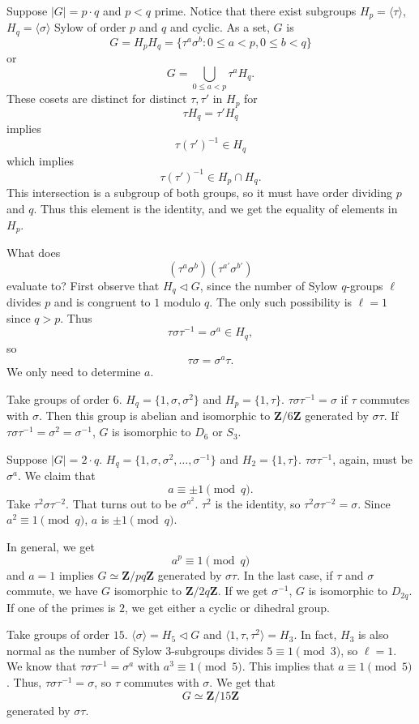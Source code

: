 \documentclass[11pt, oneside]{amsart}
\numberwithin{equation}{section}
\numberwithin{theorem}{section}
\theoremstyle{definition}
\def\Z{\mathbf{Z}}
\begin{document}
{Suppose $|G| = p\cdot q$ and $p< q$ prime. Notice that there exist subgroups $H_p = \langle \tau\rangle$, $H_q= \langle\sigma\rangle$ Sylow of order $p$ and $q$ and cyclic. As a set, $G$ is  
$$
G = H_p H_q = \{ \tau^a\sigma^b : 0\leqslant a< p, 0\leqslant b<q \}
$$
or
$$
G = \bigcup_{0\leqslant a < p} \tau ^ a H_q.
$$
These cosets are distinct for distinct $\tau, \tau'$ in $H_p$ for 
$$
\tau H_q = \tau'H_q
$$
implies
$$
\tau(\tau')^{-1} \in H_q
$$
which implies
$$
\tau(\tau')^{-1}\in H_p\cap H_q. 
$$
This intersection is a subgroup of both groups, so it must have order dividing $p$ and $q$. Thus this element is the identity, and we get the equality of elements in $H_p$. 

What does
$$
(\tau^a\sigma^b)(\tau^{a'}\sigma^{b'})
$$
evaluate to? First observe that $H_q\lhd G$, since the number of Sylow $q$-groups $\ell$ divides $p$ and is congruent to $1$ modulo $q$. The only such possibility is $\ell = 1$ since $q > p$. Thus 
$$
\tau\sigma\tau^{-1} = \sigma^a \in H_q,
$$
so 
$$
\tau\sigma = \sigma^a\tau.
$$
We only need to determine $a$. 

Take groups of order $6$. $H_q = \{ 1,\sigma,\sigma^2\}$ and $H_p = \{  1,\tau\}$. $\tau\sigma\tau^{-1} = \sigma$ if $\tau$ commutes with $\sigma$. Then this group is abelian and isomorphic to $\Z/6\Z$ generated by $\sigma\tau$. If $\tau\sigma\tau^{-1} = \sigma^2 = \sigma^{-1}$, $G$ is isomorphic to $D_6$ or $S_3$.

Suppose $|G| = 2\cdot q$. $H_q = \{1,\sigma,\sigma^2,\hdots,\sigma^{-1}\}$ and $H_2 = \{1,\tau\}$. $\tau\sigma\tau^{-1}$, again, must be $\sigma^a$. We claim that 
$$
a\equiv \pm 1\pmod q.
$$
Take $\tau^2\sigma\tau^{-2}$. That turns out to be $\sigma^{a^2}$. $\tau^2$ is the identity, so $\tau^2\sigma\tau^{-2} = \sigma$. Since ${a^2} \equiv 1 \pmod q$, $a$ is $\pm 1 \pmod q$.

In general, we get
$$
a^p \equiv 1\pmod q
$$
and $a=1$ implies $G\simeq \Z/pq\Z$ generated by $\sigma\tau$. In the last case, if $\tau$ and $\sigma$ commute, we have $G$ isomorphic to $\Z/2q\Z$. If we get $\sigma ^{-1}$, $G$ is isomorphic to $D_{2q}$. If one of the primes is $2$, we get either a cyclic or dihedral group.

Take groups of order $15$. $\langle \sigma \rangle = H_5 \lhd G$ and $\langle1, \tau,\tau^2\rangle = H_3$. In fact, $H_3$ is also normal as the number of Sylow $3$-subgroups divides $5\equiv 1\pmod 3$, so $\ell=1$. We know that $\tau\sigma\tau^{-1} = \sigma^a$ with $a^3\equiv 1\pmod 5$. This implies that $a\equiv 1\pmod 5$. Thus, $\tau\sigma\tau^{-1} = \sigma$, so $\tau$ commutes with $\sigma$. We get that 
$$
G\simeq \Z/15\Z
$$
generated by $\sigma\tau$. 

}
\end{document}
